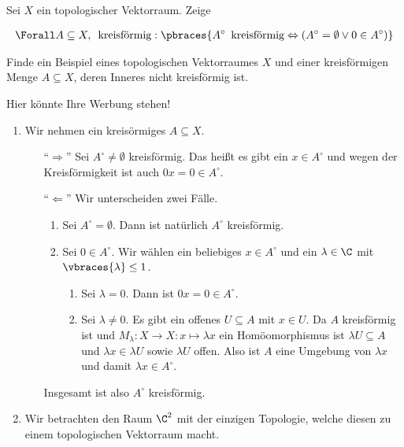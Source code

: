 \begin{exercise}

Sei $X$ ein topologischer Vektorraum.
Zeige

\begin{align*}
  \Forall A \subseteq X, \enspace \text{kreisförmig}:
  \pbraces
  {
    A^\circ \enspace \text{kreisförmig}
    \Leftrightarrow
    (A^\circ = \emptyset \lor 0 \in A^\circ)
  }
\end{align*}

Finde ein Beispiel eines topologischen Vektorraumes $X$ und einer kreisförmigen Menge $A \subseteq X$, deren
Inneres nicht kreisförmig ist.

\end{exercise}

\begin{solution}
Hier könnte Ihre Werbung stehen!
\begin{enumerate}[label = (\roman*)]
  \item Wir nehmen ein kreisörmiges $A \subseteq X$.
  \begin{enumerate}
    \item[``$\Rightarrow$''] Sei $A^\circ \neq \emptyset$ kreisförmig. Das heißt es gibt ein $x \in A^\circ$ und wegen der Kreisförmigkeit ist auch $0x = 0 \in A^\circ$.
    \item[``$\Leftarrow$'']  Wir unterscheiden zwei Fälle.
    \begin{enumerate}[label = Fall \arabic*:]
      \item Sei $A^\circ = \emptyset$. Dann ist natürlich $A^\circ$ kreisförmig.
      \item Sei $0 \in A^\circ$. Wir wählen ein beliebiges $x \in A^\circ$ und ein $\lambda \in \C$ mit $\vbraces{\lambda} \leq 1$.
      \begin{enumerate}[label = Fall 2.\arabic*:]
        \item Sei $\lambda = 0$. Dann ist $0x = 0 \in A^\circ$.
        \item Sei $\lambda \neq 0$. Es gibt ein offenes $U \subseteq A$ mit $x \in U$. Da $A$ kreisförmig ist und $M_\lambda: X \to X : x \mapsto \lambda x$ ein Homöomorphismus ist $\lambda U \subseteq A$ und $\lambda x \in \lambda U$ sowie $\lambda U$ offen. Also ist $A$ eine Umgebung von $\lambda x$ und damit $\lambda x \in A^\circ$.
      \end{enumerate}
    \end{enumerate}
    Insgesamt ist also $A^\circ$ kreisförmig.
  \end{enumerate}
  \item Wir betrachten den Raum $\C^2$ mit der einzigen Topologie, welche diesen zu einem topologischen Vektorraum macht.

\end{enumerate}
\end{solution}
